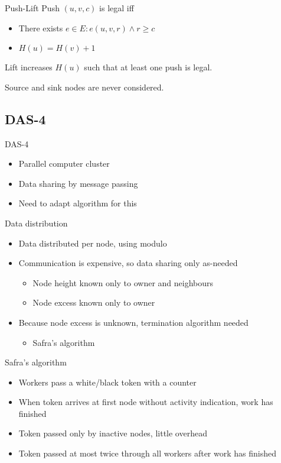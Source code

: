 \documentclass{beamer}
\begin{document}
\begin{frame}{Push-Lift}
	Push $(u, v, c)$ is legal iff
	\begin{itemize}
		\item There exists $e \in E: e(u, v, r) \land r \geq c$
		\item $H(u) = H(v) + 1$
	\end{itemize}

	Lift increases $H(u)$ such that at least one push is legal.

	Source and sink nodes are never considered.
\end{frame}

\subsection{DAS-4}

\begin{frame}{DAS-4}
	\begin{itemize}
		\item Parallel computer cluster
		\item Data sharing by message passing
		\item Need to adapt algorithm for this
	\end{itemize}
\end{frame}

\begin{frame}{Data distribution}
	\begin{itemize}
		\item Data distributed per node, using modulo
		\item Communication is expensive, so data sharing only as-needed\pause
			\begin{itemize}
				\item Node height known only to owner and neighbours
				\item Node excess known only to owner
			\end{itemize}\pause
		\item Because node excess is unknown, termination algorithm needed
			\begin{itemize}
				\item Safra's algorithm
			\end{itemize}
	\end{itemize}
\end{frame}

\begin{frame}{Safra's algorithm}
	\begin{itemize}
		\item Workers pass a white/black token with a counter
		\item When token arrives at first node without activity indication, work has finished
		\item Token passed only by inactive nodes, little overhead
		\item Token passed at most twice through all workers after work has finished
	\end{itemize}
\end{frame}
\end{document}
